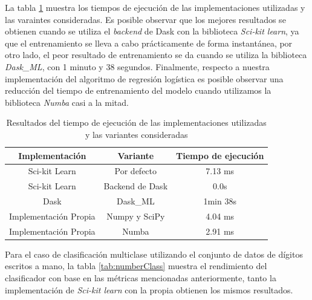 \documentclass[runningheads]{llncs}
\begin{document}
La tabla \ref{tab:logRegTime} muestra los tiempos de ejecución de las implementaciones utilizadas y las varaintes consideradas. Es posible observar que los mejores resultados se obtienen cuando se utiliza el \textit{backend} de Dask con la biblioteca \textit{Sci-kit learn}, ya que el entrenamiento se lleva a cabo prácticamente de forma instantánea, por otro lado, el peor resultado de entrenamiento se da cuando se utiliza la biblioteca \textit{Dask\_ML}, con 1 minuto y 38 segundos. Finalmente, respecto a nuestra implementación del algoritmo de regresión logística es posible observar una reducción del tiempo de entrenamiento del modelo cuando utilizamos la biblioteca \textit{Numba} casi a la mitad.

\begin{table}[h]
    \centering
    \begin{tabular}{|c|c|c|}
    \hline
       Implementación & Variante & Tiempo de ejecución \\
       \hline
       Sci-kit Learn & Por defecto & 7.13 ms\\
       Sci-kit Learn & Backend de Dask & 0.0s\\
       Dask & Dask\_ML & 1min 38s\\
       Implementación Propia & Numpy y SciPy & 4.04 ms\\
       Implementación Propia & Numba & 2.91 ms\\
       \hline
    \end{tabular}
    \caption{Resultados del tiempo de ejecución de las implementaciones utilizadas y las variantes consideradas}
    \label{tab:logRegTime}
\end{table}

Para el caso de clasificación multiclase utilizando el conjunto de datos de dígitos escritos a mano, la tabla \ref{tab:numberClass} muestra el rendimiento del clasificador con base en las métricas mencionadas anteriormente, tanto la implementación de \textit{Sci-kit learn} con la propia obtienen los mismos resultados.
\end{document}
